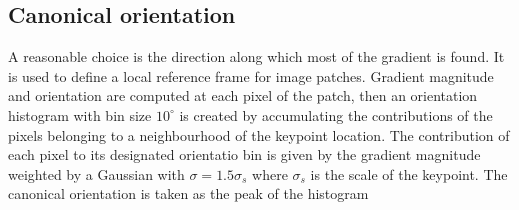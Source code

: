 \documentclass{article}
\begin{document}
\subsection{Canonical orientation}
A reasonable choice is the direction along which most of the gradient is found. It is used to define a local reference frame for image patches. Gradient magnitude and orientation are computed at each pixel of the patch, then an orientation histogram with bin size $10^\circ$ is created by accumulating the contributions of the pixels belonging to a neighbourhood of the keypoint location. The contribution of each pixel to its designated orientatio bin is given by the gradient magnitude weighted by a Gaussian with $\sigma = 1.5\sigma_s$ where $\sigma_s$ is the scale of the keypoint. The canonical orientation is taken as the peak of the histogram
\end{document}
